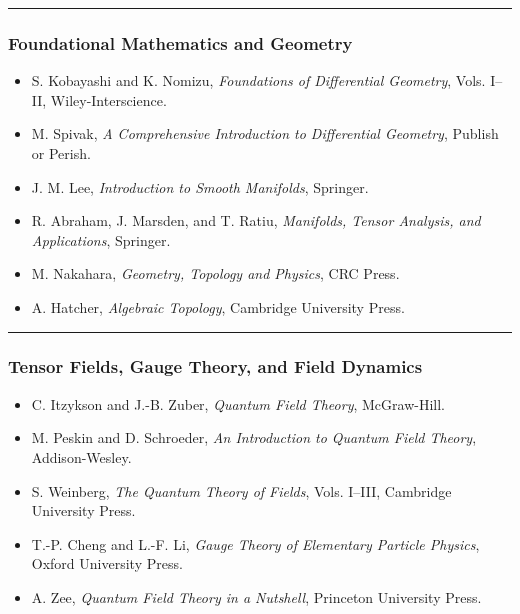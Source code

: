 \begin{center}\rule{0.5\linewidth}{0.5pt}\end{center}

\subsubsection{Foundational Mathematics and Geometry}\label{foundational-mathematics-and-geometry}

\begin{itemize}
\tightlist
\item
  S. Kobayashi and K. Nomizu, \emph{Foundations of Differential Geometry}, Vols. I--II, Wiley-Interscience.
\item
  M. Spivak, \emph{A Comprehensive Introduction to Differential Geometry}, Publish or Perish.
\item
  J. M. Lee, \emph{Introduction to Smooth Manifolds}, Springer.
\item
  R. Abraham, J. Marsden, and T. Ratiu, \emph{Manifolds, Tensor Analysis, and Applications}, Springer.
\item
  M. Nakahara, \emph{Geometry, Topology and Physics}, CRC Press.
\item
  A. Hatcher, \emph{Algebraic Topology}, Cambridge University Press.
\end{itemize}

\begin{center}\rule{0.5\linewidth}{0.5pt}\end{center}

\subsubsection{Tensor Fields, Gauge Theory, and Field Dynamics}\label{tensor-fields-gauge-theory-and-field-dynamics}

\begin{itemize}
\tightlist
\item
  C. Itzykson and J.-B. Zuber, \emph{Quantum Field Theory}, McGraw-Hill.
\item
  M. Peskin and D. Schroeder, \emph{An Introduction to Quantum Field Theory}, Addison-Wesley.
\item
  S. Weinberg, \emph{The Quantum Theory of Fields}, Vols. I--III, Cambridge University Press.
\item
  T.-P. Cheng and L.-F. Li, \emph{Gauge Theory of Elementary Particle Physics}, Oxford University Press.
\item
  A. Zee, \emph{Quantum Field Theory in a Nutshell}, Princeton University Press.
\end{itemize}

